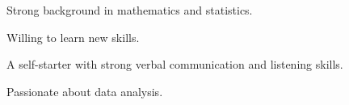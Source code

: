 

\begin{cventries}

  \cventry
    {} %
    {} %
    {} %
    {} %
    {
      \begin{cvitems} %
      \item Strong background in mathematics and statistics.
      \item Willing to learn new skills.
      \item A self-starter with strong verbal communication and listening skills.
      \item Passionate about data analysis. 
      \end{cvitems}
    }


\end{cventries}
